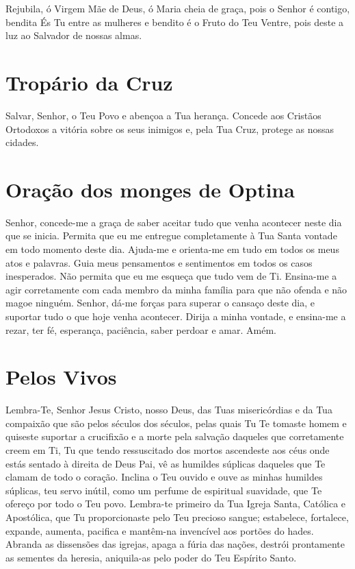 \documentclass{subfiles}
\begin{document}
Rejubila, ó Virgem Mãe de Deus, ó Maria cheia de graça, pois o Senhor é contigo,
bendita És Tu entre as mulheres e bendito é o Fruto do Teu Ventre, pois deste a
luz ao Salvador de nossas almas.

\section*{Tropário da Cruz}

Salvar, Senhor, o Teu Povo e abençoa a Tua herança. Concede aos Cristãos
Ortodoxos a vitória sobre os seus inimigos e, pela Tua Cruz, protege as nossas
cidades.

\section*{Oração dos monges de Optina}

Senhor, concede-me a graça de saber aceitar tudo que venha acontecer neste dia
que se inicia. Permita que eu me entregue completamente à Tua Santa vontade em
todo momento deste dia. Ajuda-me e orienta-me em tudo em todos os meus atos e
palavras. Guia meus pensamentos e sentimentos em todos os casos inesperados. Não
permita que eu me esqueça que tudo vem de Ti. Ensina-me a agir corretamente com
cada membro da minha família para que não ofenda e não magoe ninguém. Senhor,
dá-me forças para superar o cansaço deste dia, e suportar tudo o que hoje venha
acontecer. Dirija a minha vontade, e ensina-me a rezar, ter fé, esperança,
paciência, saber perdoar e amar. Amém.



\section*{Pelos Vivos}

Lembra-Te, Senhor Jesus Cristo, nosso Deus, das Tuas misericórdias e da Tua
compaixão que são pelos séculos dos séculos, pelas quais Tu Te tomaste homem e
quiseste suportar a crucifixão e a morte pela salvação daqueles que corretamente
creem em Ti, Tu que tendo ressuscitado dos mortos ascendeste aos céus onde estás
sentado à direita de Deus Pai, vê as humildes súplicas daqueles que Te clamam de
todo o coração. Inclina o Teu ouvido e ouve as minhas humildes súplicas, teu
servo inútil, como um perfume de espiritual suavidade, que Te ofereço por todo o
Teu povo. Lembra-te primeiro da Tua Igreja Santa, Católica e Apostólica, que Tu
proporcionaste pelo Teu precioso sangue; estabelece, fortalece, expande,
aumenta, pacifica e mantêm-na invencível aos portões do hades. Abranda as
dissensões das igrejas, apaga a fúria das nações, destrói prontamente as
sementes da heresia, aniquila-as pelo poder do Teu Espírito Santo.
\metanoia{}
\end{document}
